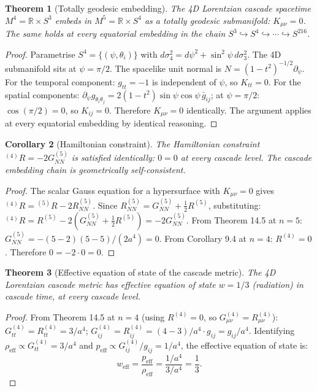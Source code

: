 \documentclass[12pt,a4paper]{article}
\newtheorem{theorem}{Theorem}[section]
\newtheorem{corollary}[theorem]{Corollary}
\begin{document}
\begin{theorem}[Totally geodesic embedding]
The 4D Lorentzian cascade spacetime
$M^4 = \mathbb{R} \times S^3$ embeds in $M^5 = \mathbb{R} \times S^4$ as a totally geodesic submanifold: $K_{\mu\nu} = 0$. The
same holds at every equatorial embedding in the chain $S^3 \hookrightarrow S^4 \hookrightarrow \cdots \hookrightarrow S^{216}$.
\end{theorem}

\begin{proof}
Parametrise $S^4 = \{(\psi, \theta_i)\}$ with $d\sigma_4^2 = d\psi^2 + \sin^2\psi\,d\sigma_3^2$. The 4D submanifold
sits at $\psi = \pi/2$. The spacelike unit normal is $N = (1 - t^2)^{-1/2}\partial_\psi$. For the temporal
component: $g_{tt} = -1$ is independent of $\psi$, so $K_{tt} = 0$. For the spatial components:
$\partial_\psi g_{\theta_i\theta_j} = 2(1 - t^2)\sin\psi\cos\psi\,\bar{g}_{ij}$; at $\psi = \pi/2$: $\cos(\pi/2) = 0$, so $K_{ij} = 0$. Therefore
$K_{\mu\nu} = 0$ identically. The argument applies at every equatorial embedding by identical
reasoning.
\end{proof}

\begin{corollary}[Hamiltonian constraint]
The Hamiltonian constraint ${}^{(4)}R = -2G^{(5)}_{NN}$
is satisfied identically: $0 = 0$ at every cascade level. The cascade embedding chain is
geometrically self-consistent.
\end{corollary}

\begin{proof}
The scalar Gauss equation for a hypersurface with $K_{\mu\nu} = 0$ gives ${}^{(4)}R = {}^{(5)}R - 2R^{(5)}_{NN}$.
Since $R^{(5)}_{NN} = G^{(5)}_{NN} + \tfrac{1}{2}R^{(5)}$, substituting: ${}^{(4)}R = R^{(5)} - 2(G^{(5)}_{NN} + \tfrac{1}{2}R^{(5)}) = -2G^{(5)}_{NN}$. From
Theorem 14.5 at $n = 5$: $G^{(5)}_{NN} = -(5 - 2)(5 - 5)/(2a^4) = 0$. From Corollary 9.4 at $n = 4$:
$R^{(4)} = 0$. Therefore $0 = -2 \cdot 0 = 0$. \checkmark
\end{proof}

\begin{theorem}[Effective equation of state of the cascade metric]
The 4D Lorentzian
cascade metric has effective equation of state $w = 1/3$ (radiation) in cascade time, at every
cascade level.
\end{theorem}

\begin{proof}
From Theorem 14.5 at $n = 4$ (using $R^{(4)} = 0$, so $G^{(4)}_{\mu\nu} = R^{(4)}_{\mu\nu}$): $G^{(4)}_{tt} = R^{(4)}_{tt} = 3/a^4$;
$G^{(4)}_{ij} = R^{(4)}_{ij} = (4 - 3)/a^4 \cdot g_{ij} = g_{ij}/a^4$. Identifying $\rho_{\text{eff}} \propto G^{(4)}_{tt} = 3/a^4$ and $p_{\text{eff}} \propto G^{(4)}_{ij}/g_{ij} =
1/a^4$, the effective equation of state is:
\[
w_{\text{eff}} = \frac{p_{\text{eff}}}{\rho_{\text{eff}}} = \frac{1/a^4}{3/a^4} = \frac{1}{3}.
\]
\end{proof}
\end{document}
